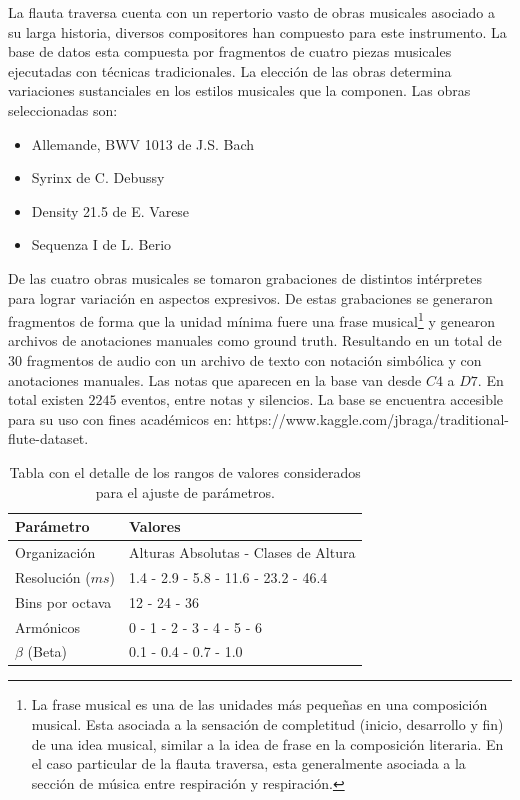 \documentclass
  [ams,pdfout]%
	{aeslac}
\begin{document}
La flauta traversa cuenta con un repertorio vasto de obras musicales asociado a su larga historia,  diversos compositores han compuesto para este instrumento. La base de datos esta compuesta por fragmentos de cuatro piezas musicales ejecutadas con técnicas tradicionales. La elección de las obras determina variaciones sustanciales en los estilos musicales que la componen. Las obras seleccionadas son:
\begin{itemize}
\item Allemande, BWV 1013 de J.S. Bach
\item Syrinx de C. Debussy
\item Density 21.5 de E. Varese
\item Sequenza I de L. Berio
\end{itemize} 

%
De las cuatro obras musicales se tomaron grabaciones de distintos intérpretes para lograr variación en aspectos expresivos. De estas grabaciones se generaron fragmentos de forma que la unidad mínima fuere una frase musical\footnote{La frase musical es una de las unidades más pequeñas en una composición musical. Esta asociada a la sensación de completitud (inicio, desarrollo y fin) de una idea musical, similar a la idea de frase en la composición literaria. En el caso particular de la flauta traversa, esta generalmente asociada a la sección de música entre respiración y respiración\cite{blom1955grove}.} y genearon archivos de anotaciones manuales como ground truth. Resultando en un total de 30 fragmentos de audio con un archivo de texto con notación simbólica y con anotaciones manuales. Las notas que aparecen en la base van desde $C4$ a $D7$. En total existen $2245$ eventos, entre notas y silencios. La base se encuentra accesible para su uso con fines académicos en: https://www.kaggle.com/jbraga/traditional-flute-dataset.


\begin{table}[!ht]
\caption{Tabla con el detalle de los rangos de valores considerados para el ajuste de parámetros.}
\label{tab:parametros}
\vspace*{10pt}
\centering
\small
\begin{tabular}{ll}
\textbf{Parámetro}	&	\textbf{Valores}\\ \hline
Organización           & Alturas Absolutas - Clases de Altura        \\ 
Resolución ($ms$) & 1.4 - 2.9 - 5.8 - 11.6 - 23.2 - 46.4        \\ 
Bins por octava                       & 12 - 24 - 36                                \\ 
Armónicos                             & 0 - 1 - 2 - 3 - 4 - 5 - 6                   \\ 
$\beta$ (Beta)                        & 0.1 - 0.4 - 0.7 - 1.0  \\ 
\end{tabular}
\end{table}
\end{document}
